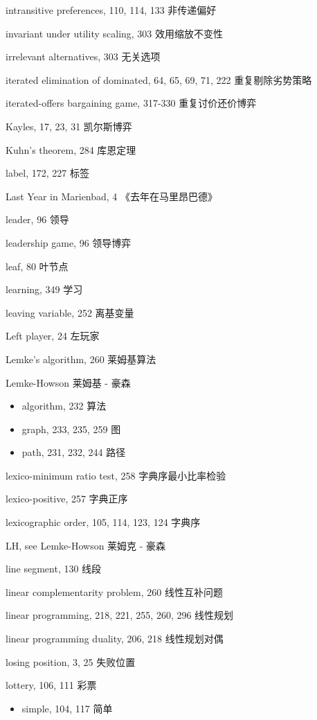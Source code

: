 intransitive preferences, 110, 114, 133 非传递偏好 

invariant under utility scaling, 303 效用缩放不变性 

irrelevant alternatives, 303 无关选项

iterated elimination of dominated, 64, 65, 69, 71, 222 重复剔除劣势策略 


iterated-offers bargaining game, 317-330 重复讨价还价博弈


Kayles, 17, 23, 31  凯尔斯博弈 


Kuhn's theorem, 284 库恩定理 

label, 172, 227 标签 

Last Year in Marienbad, 4 《去年在马里昂巴德》

leader, 96 领导  

leadership game, 96 领导博弈 

leaf, 80 叶节点 

learning, 349 学习 

leaving variable, 252 离基变量 

Left player, 24 左玩家 

Lemke's algorithm, 260 莱姆基算法 

Lemke-Howson 莱姆基 - 豪森
\begin{itemize}
\item[] algorithm, 232  算法 
\item[] graph, 233, 235, 259 图 
\item[] path, 231, 232, 244 路径
\end{itemize} 

lexico-minimum ratio test, 258 字典序最小比率检验 

lexico-positive, 257 字典正序 

lexicographic order, 105, 114, 123, 124 字典序 

LH, see Lemke-Howson 莱姆克 - 豪森

line segment, 130 线段 

linear complementarity problem, 260 线性互补问题 

linear programming, 218, 221, 255, 260, 296  线性规划 

linear programming duality, 206, 218 线性规划对偶 

losing position, 3, 25 失败位置

lottery, 106, 111 彩票 
\begin{itemize}
\item[] simple, 104, 117 简单  
\end{itemize} 

